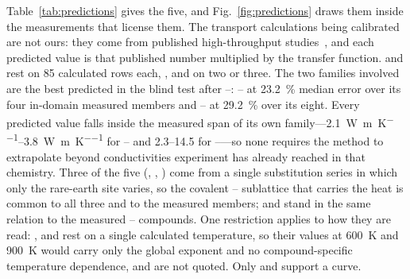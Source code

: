 Table~\ref{tab:predictions} gives the five, and Fig.~\ref{fig:predictions} draws them inside the
measurements that license them. The transport calculations being calibrated are not ours: they come
from published high-throughput
studies~\cite{li2025highthroug,ohnishi2026database,miyazaki2021machine}, and each predicted value is
that published number multiplied by the transfer function.  and  rest on
\num{85} calculated rows each, ,  and  on two or three. The two
families involved are the best predicted in the blind test after --: --
at \SI{23.2}{\percent} median error over its four in-domain measured members and -- at
\SI{29.2}{\percent} over its eight. Every predicted value falls inside the measured span of its own
family---\SIrange{2.1}{3.8}{\watt\per\meter\per\kelvin} for -- and
\SIrange{2.3}{14.5}{} for -----so none requires the method to extrapolate beyond
conductivities experiment has already reached in that chemistry. Three of the five (,
, ) come from a single substitution series in which only the rare-earth site
varies, so the covalent -- sublattice that carries the heat is common to all three and
to the measured members;  and  stand in the same relation to the measured
-- compounds. One restriction applies to how they are read: , 
and  rest on a single calculated temperature, so their values at \SI{600}{\kelvin} and
\SI{900}{\kelvin} would carry only the global exponent and no compound-specific temperature
dependence, and are not quoted. Only  and  support a curve.

